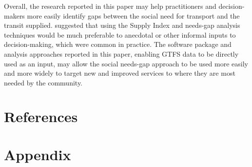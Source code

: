 \documentclass[preprint, 3p,
authoryear]{elsarticle} %
\begin{document}
Overall, the research reported in this paper may help practitioners and
decision-makers more easily identify gaps between the social need for
transport and the transit supplied. \citet{currie2010identifying}
suggested that using the Supply Index and needs-gap analysis techniques
would be much preferable to anecdotal or other informal inputs to
decision-making, which were common in practice. The software package and
analysis approaches reported in this paper, enabling GTFS data to be
directly used as an input, may allow the social needs-gap approach to be
used more easily and more widely to target new and improved services to
where they are most needed by the community.

\section*{References}\label{references}

\section{Appendix}\label{appendix}
\end{document}

